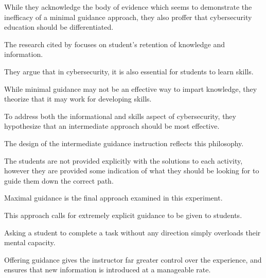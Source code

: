 While they acknowledge the body of evidence which seems to demonstrate the inefficacy of a minimal guidance approach, they also proffer that cybersecurity education should be differentiated. %



The research cited by \citeauthor{J-Sweller} focuses on student's retention of knowledge and information. %



They argue that in cybersecurity, it is also essential for students to learn skills. %



While minimal guidance may not be an effective way to impart knowledge, they theorize that it may work for developing skills. %



To address both the informational and skills aspect of cybersecurity, they hypothesize that an intermediate approach should be most effective. 







        The design of the intermediate guidance instruction reflects this philosophy. %



The students are not provided explicitly with the solutions to each activity, however they are provided some indication of what they should be looking for to guide them down the correct path.










        Maximal guidance is the final approach examined in this experiment. %



This approach calls for extremely explicit guidance to be given to students. %



Asking a student to complete a task without any direction simply overloads their mental capacity. %



Offering guidance gives the instructor far greater control over the experience, and ensures that new information is introduced at a manageable rate. 







